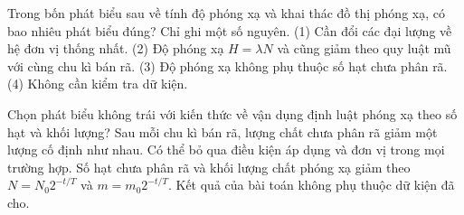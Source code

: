 \begin{ex}
Trong bốn phát biểu sau về tính độ phóng xạ và khai thác đồ thị phóng xạ, có bao nhiêu phát biểu đúng? Chỉ ghi một số nguyên. (1) Cần đổi các đại lượng về hệ đơn vị thống nhất. (2) Độ phóng xạ $H=\lambda N$ và cũng giảm theo quy luật mũ với cùng chu kì bán rã. (3) Độ phóng xạ không phụ thuộc số hạt chưa phân rã. (4) Không cần kiểm tra dữ kiện.
\end{ex}

\begin{ex}
Chọn phát biểu không trái với kiến thức về vận dụng định luật phóng xạ theo số hạt và khối lượng?
\choice
{Sau mỗi chu kì bán rã, lượng chất chưa phân rã giảm một lượng cố định như nhau.}
{Có thể bỏ qua điều kiện áp dụng và đơn vị trong mọi trường hợp.}
{\True Số hạt chưa phân rã và khối lượng chất phóng xạ giảm theo $N=N_0 2^{-t/T}$ và $m=m_0 2^{-t/T}$.}
{Kết quả của bài toán không phụ thuộc dữ kiện đã cho.}
\end{ex}

